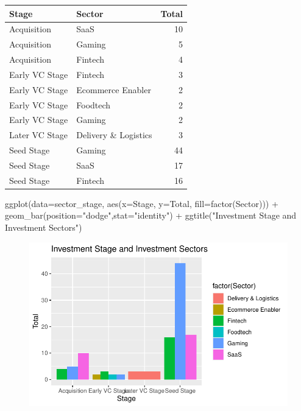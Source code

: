\documentclass[
  letterpaper,
  DIV=11,
  numbers=noendperiod]{scrreprt}
\newenvironment{Shaded}{\begin{snugshade}}{\end{snugshade}}
\newcommand{\AttributeTok}[1]{\textcolor[rgb]{0.40,0.45,0.13}{#1}}
\newcommand{\FunctionTok}[1]{\textcolor[rgb]{0.28,0.35,0.67}{#1}}
\newcommand{\NormalTok}[1]{\textcolor[rgb]{0.00,0.23,0.31}{#1}}
\newcommand{\SpecialCharTok}[1]{\textcolor[rgb]{0.37,0.37,0.37}{#1}}
\newcommand{\StringTok}[1]{\textcolor[rgb]{0.13,0.47,0.30}{#1}}
\begin{document}
\begin{longtable}[]{@{}llr@{}}
\toprule()
Stage & Sector & Total \\
\midrule()
\endhead
Acquisition & SaaS & 10 \\
Acquisition & Gaming & 5 \\
Acquisition & Fintech & 4 \\
Early VC Stage & Fintech & 3 \\
Early VC Stage & Ecommerce Enabler & 2 \\
Early VC Stage & Foodtech & 2 \\
Early VC Stage & Gaming & 2 \\
Later VC Stage & Delivery \& Logistics & 3 \\
Seed Stage & Gaming & 44 \\
Seed Stage & SaaS & 17 \\
Seed Stage & Fintech & 16 \\
\bottomrule()
\end{longtable}

\begin{Shaded}
\begin{Highlighting}[]
\FunctionTok{ggplot}\NormalTok{(}\AttributeTok{data=}\NormalTok{sector\_stage, }\FunctionTok{aes}\NormalTok{(}\AttributeTok{x=}\NormalTok{Stage, }\AttributeTok{y=}\NormalTok{Total, }\AttributeTok{fill=}\FunctionTok{factor}\NormalTok{(Sector))) }\SpecialCharTok{+}
  \FunctionTok{geom\_bar}\NormalTok{(}\AttributeTok{position=}\StringTok{"dodge"}\NormalTok{,}\AttributeTok{stat=}\StringTok{"identity"}\NormalTok{) }\SpecialCharTok{+} 
  \FunctionTok{ggtitle}\NormalTok{(}\StringTok{"Investment Stage and Investment Sectors"}\NormalTok{)}
\end{Highlighting}
\end{Shaded}

\begin{figure}[H]

{\centering \includegraphics{./assignment1_files/figure-pdf/unnamed-chunk-3-1.pdf}

}

\end{figure}
\end{document}
